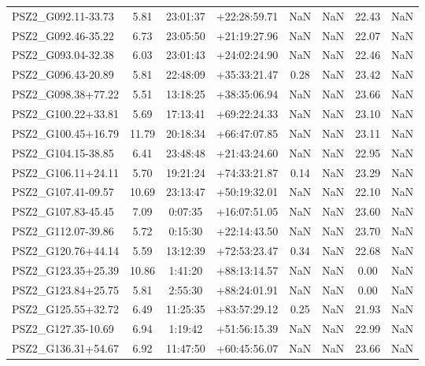 \documentclass[apj, revtex4]{emulateapj}
\begin{document}
\begin{longtable*}{lccccccc}
    PSZ2\_G092.11-33.73 &  5.81 &  23:01:37 &  +22:28:59.71 &         NaN &    NaN &   22.43 &       NaN \\
    PSZ2\_G092.46-35.22 &  6.73 &  23:05:50 &  +21:19:27.96 &         NaN &    NaN &   22.07 &       NaN \\
    PSZ2\_G093.04-32.38 &  6.03 &  23:01:43 &  +24:02:24.90 &         NaN &    NaN &   22.46 &       NaN \\
    PSZ2\_G096.43-20.89 &  5.81 &  22:48:09 &  +35:33:21.47 &        0.28 &    NaN &   23.42 &       NaN \\
    PSZ2\_G098.38+77.22 &  5.51 &  13:18:25 &  +38:35:06.94 &         NaN &    NaN &   23.66 &       NaN \\
    PSZ2\_G100.22+33.81 &  5.69 &  17:13:41 &  +69:22:24.33 &         NaN &    NaN &   23.10 &       NaN \\
    PSZ2\_G100.45+16.79 & 11.79 &  20:18:34 &  +66:47:07.85 &         NaN &    NaN &   23.11 &       NaN \\
    PSZ2\_G104.15-38.85 &  6.41 &  23:48:48 &  +21:43:24.60 &         NaN &    NaN &   22.95 &       NaN \\
    PSZ2\_G106.11+24.11 &  5.70 &  19:21:24 &  +74:33:21.87 &        0.14 &    NaN &   23.29 &       NaN \\
    PSZ2\_G107.41-09.57 & 10.69 &  23:13:47 &  +50:19:32.01 &         NaN &    NaN &   22.10 &       NaN \\
    PSZ2\_G107.83-45.45 &  7.09 &   0:07:35 &  +16:07:51.05 &         NaN &    NaN &   23.60 &       NaN \\
    PSZ2\_G112.07-39.86 &  5.72 &   0:15:30 &  +22:14:43.50 &         NaN &    NaN &   23.70 &       NaN \\
    PSZ2\_G120.76+44.14 &  5.59 &  13:12:39 &  +72:53:23.47 &        0.34 &    NaN &   22.68 &       NaN \\
    PSZ2\_G123.35+25.39 & 10.86 &   1:41:20 &  +88:13:14.57 &         NaN &    NaN &    0.00 &       NaN \\
    PSZ2\_G123.84+25.75 &  5.81 &   2:55:30 &  +88:24:01.91 &         NaN &    NaN &    0.00 &       NaN \\
    PSZ2\_G125.55+32.72 &  6.49 &  11:25:35 &  +83:57:29.12 &        0.25 &    NaN &   21.93 &       NaN \\
    PSZ2\_G127.35-10.69 &  6.94 &   1:19:42 &  +51:56:15.39 &         NaN &    NaN &   22.99 &       NaN \\
    PSZ2\_G136.31+54.67 &  6.92 &  11:47:50 &  +60:45:56.07 &         NaN &    NaN &   23.66 &       NaN \\

\end{longtable*}
\end{document}
